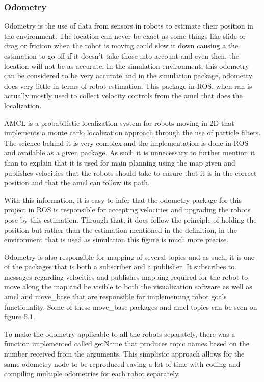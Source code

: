     \subsubsection{Odometry}
      Odometry is the use of data from sensors in robots to estimate their position in the environment. The location can never be exact as some things like slide or drag or friction when the robot is moving could slow it down causing a the estimation to go off if it doesn't take those into account and even then, the location will not be as accurate. In the simulation environment, this odometry can be considered to be very accurate and in the simulation package, odometry does very little in terms of robot estimation. This package in ROS, when ran is actually mostly used to collect velocity controls from the amcl that does the localization.

      AMCL is a probabilistic localization system for robots moving in 2D that implements a monte carlo localization approach through the use of particle filters. The science behind it is very complex and the implementation is done in ROS and available as a given package. As such it is unnecessary to further mention it than to explain that it is used for main planning using the map given and publishes velocities that the robots should take to ensure that it is in the correct position and that the amcl can follow its path.

      With this information, it is easy to infer that the odometry package for this project in ROS is responsible for accepting velocities and upgrading the robots pose by this estimation. Through that, it does follow the principle of holding the position but rather than the estimation mentioned in the definition, in the environment that is used as simulation this figure is much more precise.

      Odometry is also responsible for mapping of several topics and as such, it is one of the packages that is both a subscriber and a publisher. It subscribes to messages regarding velocities and publishes mapping required for the robot to move along the map and be visible to both the visualization software as well as amcl and move\_base that are responsible for implementing robot goals functionality. Some of these move\_base packages and amcl topics can be seen on figure 5.1.

      To make the odometry applicable to all the robots separately, there was a function implemented called getName that produces topic names based on the number received from the arguments. This simplistic approach allows for the same odometry node to be reproduced saving a lot of time with coding and compiling multiple odometries for each robot separately.

